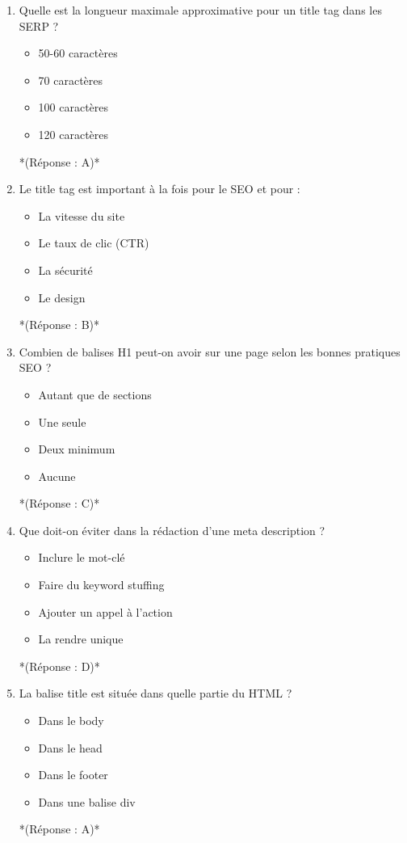 \documentclass[12pt,a4paper,twoside]{report}
\begin{document}
\begin{enumerate}
\item Quelle est la longueur maximale approximative pour un title tag dans les SERP ?
\begin{itemize}
\item[A)] 50-60 caractères
\item[B)] 70 caractères
\item[C)] 100 caractères
\item[D)] 120 caractères
\end{itemize}
*(Réponse : A)*

\item Le title tag est important à la fois pour le SEO et pour :
\begin{itemize}
\item[A)] La vitesse du site
\item[B)] Le taux de clic (CTR)
\item[C)] La sécurité
\item[D)] Le design
\end{itemize}
*(Réponse : B)*

\item Combien de balises H1 peut-on avoir sur une page selon les bonnes pratiques SEO ?
\begin{itemize}
\item[A)] Autant que de sections
\item[B)] Une seule
\item[C)] Deux minimum
\item[D)] Aucune
\end{itemize}
*(Réponse : C)*

\item Que doit-on éviter dans la rédaction d'une meta description ?
\begin{itemize}
\item[A)] Inclure le mot-clé
\item[B)] Faire du keyword stuffing
\item[C)] Ajouter un appel à l'action
\item[D)] La rendre unique
\end{itemize}
*(Réponse : D)*

\item La balise title est située dans quelle partie du HTML ?
\begin{itemize}
\item[A)] Dans le body
\item[B)] Dans le head
\item[C)] Dans le footer
\item[D)] Dans une balise div
\end{itemize}
*(Réponse : A)*


\end{enumerate}
\end{document}
